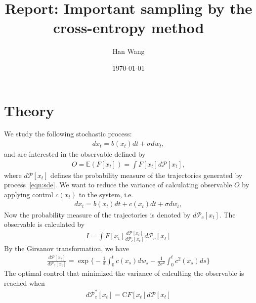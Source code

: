\documentclass[aip,jcp,a4paper,reprint,onecolumn]{revtex4-1}
\newcommand{\pathmeas}{d\mathcal P}
\begin{document}
\title{Report: Important sampling by the cross-entropy method}
\author{Han Wang}

\date{\today}

\begin{abstract}
\end{abstract}

\maketitle

\section{Theory}
We study the following stochastic process:
\begin{align}\label{eqn:sde}
  dx_t = b(x_t) dt + \sigma dw_t,
\end{align}
and are interested in the observable defined by
\begin{align}
  O = \mathbb E(F[x_t]) = \int F[x_t] \pathmeas[x_t],
\end{align}
where $\pathmeas[x_t]$ defines the probability measure of the
trajectories generated by process~\eqref{eqn:sde}.  We want to reduce
the variance of calculating observable $O$ by applying control
$c(x_t)$ to the system, i.e.
\begin{align}
  dx_t = b(x_t) dt + c(x_t) dt + \sigma dw_t,  
\end{align}
Now the probability measure of the trajectories is denoted by
$\pathmeas_c[x_t]$. The observable is calculated by
\begin{align}
  I = \int F[x_t] \frac{\pathmeas[x_t]}{\pathmeas_c[x_t]} \pathmeas_c[x_t]
\end{align}
By the Girsanov transformation, we have
\begin{align}
  \frac{\pathmeas[x_t]}{\pathmeas_c[x_t]} = 
  \exp \Big\{ - \frac 1\sigma \int_0^t c(x_s) dw_s - \frac1{2\sigma^2} \int_0^t c^2(x_s) ds\Big\}
\end{align}
The optimal control that minimized the variance of calculting the observable is reached when
\begin{align}\label{eqn:min-cond-1}
  \pathmeas_c^\ast[x_t] =\textrm{C} F[x_t] \pathmeas[x_t]
\end{align}
\end{document}
